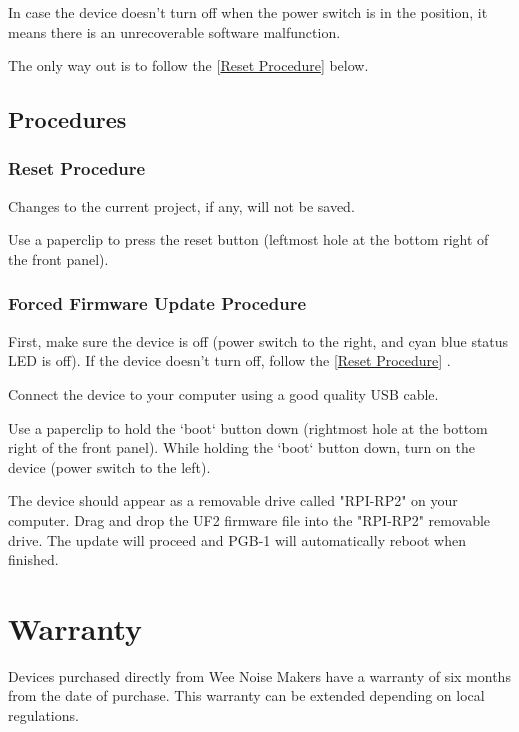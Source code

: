 \documentclass[8pt]{extarticle}
\def\device{PGB-1 }
\def\WNM{Wee Noise Makers }
\newcommand{\reflabel}[2]{
[\hyperref[#1]{#2}]
}
\begin{document}
\begin{multicols*}{3}
In case the device doesn't turn off when the power switch is in the  position, it means there is an unrecoverable software malfunction.

The only way out is to follow the \reflabel{procedures:reset}{Reset Procedure} below.

\subsection{Procedures}

\subsubsection{Reset Procedure}
\label{procedures:reset}

\begin{important}
Changes to the current project, if any, will not be saved.
\end{important}

Use a paperclip to press the reset button (leftmost hole at the bottom right of the front panel).

\subsubsection{Forced Firmware Update Procedure}
\label{procedures:forced_firmware_update}

First, make sure the device is off (power switch to the right, and cyan blue status LED is off). If the device doesn't turn off, follow the \reflabel{procedures:reset}{Reset Procedure}.

Connect the device to your computer using a good quality USB cable.

Use a paperclip to hold the `boot` button down (rightmost hole at the bottom right of the front panel). While holding the `boot` button down, turn on the device (power switch to the left).

The device should appear as a removable drive called "RPI-RP2" on your computer. Drag and drop the UF2 firmware file into the "RPI-RP2" removable drive. The update will proceed and \device will automatically reboot when finished.

\section{Warranty}

Devices purchased directly from \WNM have a warranty of six months from the date of purchase. This warranty can be extended depending on local regulations.


\end{multicols*}
\end{document}
